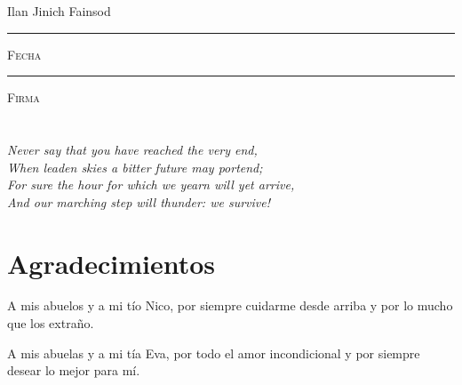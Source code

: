 \documentclass[11pt, oneside]{book}
\begin{document}
\centering

\hspace{3em}

Ilan Jinich Fainsod

\vspace{5em}

\rule[1em]{20em}{0.5pt} %

\textsc{Fecha}
 
\vspace{8em}

\rule[1em]{20em}{0.5pt} %

\textsc{Firma}

\endgroup
\vspace*{\fill}



\pagestyle{empty}
\frontmatter

\chapter*{}
\begin{flushright}
\textit{ Never say that you have reached the very end, \\
When leaden skies a bitter future may portend; \\
For sure the hour for which we yearn will yet arrive, \\
And our marching step will thunder: we survive!}
\end{flushright}



\chapter*{Agradecimientos}
%
A mis abuelos y a mi tío Nico, por siempre cuidarme desde arriba y por lo mucho que los extraño.

A mis abuelas y a mi tía Eva, por todo el amor incondicional y por siempre desear lo mejor para mí.
\end{document}
